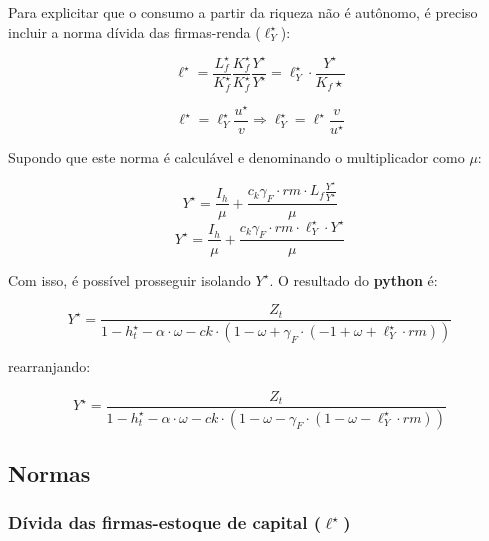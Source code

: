 \documentclass[11pt]{article}
\begin{document}
Para explicitar que o consumo a partir da riqueza não é autônomo, é preciso incluir a norma dívida das firmas-renda (\(\ell^{\star}_{Y}\)):
\begin{latex}
$$
\ell^{\star} = \frac{L_{f}^{\star}}{K_{f}^{\star}}\frac{K_{f}^{\star}}{K_{f}^{\star}}\frac{Y^{\star}}{Y^{\star}} = \ell^{\star}_{Y}\cdot\frac{Y^{\star}}{K_{f}\star}
$$
\end{latex}
\begin{latex}
\begin{equation}
\ell^{\star} = \ell_{Y}^{\star}\frac{u^{\star}}{v} \Rightarrow \ell^{\star}_{Y} = \ell^{\star}\frac{v}{u^{\star}}
\end{equation}
\end{latex}

Supondo que este norma é calculável e denominando o multiplicador como \(\mu\):
\begin{latex}
$$
Y^{\star} = \frac{I_{h}}{\mu} + \frac{c_{k}\gamma_{F}\cdot rm \cdot L_{f}\frac{Y^{\star}}{Y^{\star}}}{\mu}
$$
\begin{equation}
Y^{\star} = \frac{I_{h}}{\mu} + \frac{c_{k}\gamma_{F}\cdot rm \cdot \ell^{\star}_{Y}\cdot Y^{\star}}{\mu}
\end{equation}
\end{latex}

Com isso, é possível prosseguir isolando \(Y^{\star}\).
O resultado do \textbf{python} é:

\begin{latex}
\begin{equation}
Y^{\star} = \frac{Z_t}{1 - h^\star_t - \alpha \cdot \omega - ck \cdot \left(1 - \omega + \gamma_{F} \cdot \left(-1 + \omega + \ell^\star_Y \cdot rm\right)\right)}
\end{equation}
\end{latex}
rearranjando:
\begin{latex}
\begin{equation}
Y^{\star} = \frac{Z_t}{1 - h^\star_t - \alpha \cdot \omega - ck \cdot \left(1 - \omega - \gamma_{F} \cdot \left(1 - \omega - \ell^\star_Y \cdot rm\right)\right)}
\end{equation}
\end{latex}


\subsection*{Normas}
\label{sec:orga5f21c0}

\subsubsection*{Dívida das firmas-estoque de capital (\(\ell^{\star}\))}
\label{sec:org56ee333}
\end{document}
